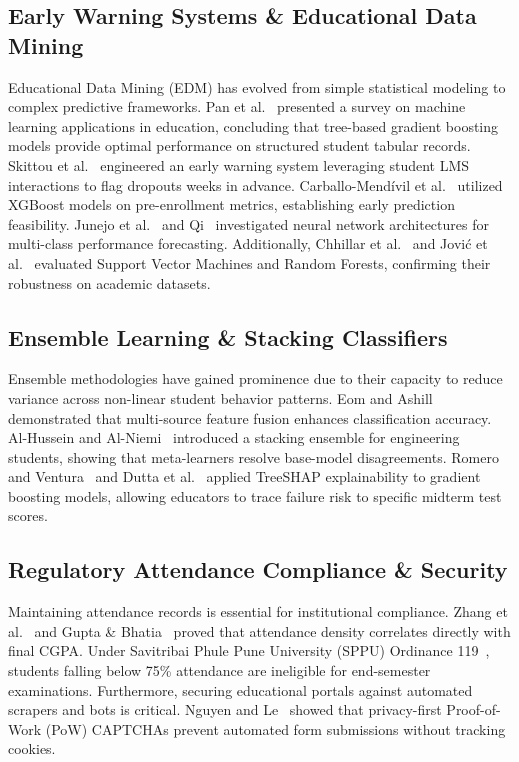 \documentclass[conference]{IEEEtran}
\begin{document}
\subsection{Early Warning Systems \& Educational Data Mining}
Educational Data Mining (EDM) has evolved from simple statistical modeling to complex predictive frameworks. Pan et al.~\cite{pan2025survey} presented a survey on machine learning applications in education, concluding that tree-based gradient boosting models provide optimal performance on structured student tabular records. Skittou et al.~\cite{skittou2024development} engineered an early warning system leveraging student LMS interactions to flag dropouts weeks in advance. Carballo-Mend\'ivil et al.~\cite{carballo2025predicting} utilized XGBoost models on pre-enrollment metrics, establishing early prediction feasibility. Junejo et al.~\cite{junejo2025accurate} and Qi~\cite{qi2026multidimensional} investigated neural network architectures for multi-class performance forecasting. Additionally, Chhillar et al.~\cite{chhillar2025comparative} and Jovi\'c et al.~\cite{jovic2022prediction} evaluated Support Vector Machines and Random Forests, confirming their robustness on academic datasets.

\subsection{Ensemble Learning \& Stacking Classifiers}
Ensemble methodologies have gained prominence due to their capacity to reduce variance across non-linear student behavior patterns. Eom and Ashill~\cite{eom2023evaluating} demonstrated that multi-source feature fusion enhances classification accuracy. Al-Hussein and Al-Niemi~\cite{alhussein2024stacking} introduced a stacking ensemble for engineering students, showing that meta-learners resolve base-model disagreements. Romero and Ventura~\cite{romero2023educational} and Dutta et al.~\cite{dutta2024multivariate} applied TreeSHAP explainability to gradient boosting models, allowing educators to trace failure risk to specific midterm test scores.

\subsection{Regulatory Attendance Compliance \& Security}
Maintaining attendance records is essential for institutional compliance. Zhang et al.~\cite{zhang2024realtime} and Gupta \& Bhatia~\cite{gupta2024attendance} proved that attendance density correlates directly with final CGPA. Under Savitribai Phule Pune University (SPPU) Ordinance 119~\cite{sppu2024ordinance}, students falling below 75\% attendance are ineligible for end-semester examinations. Furthermore, securing educational portals against automated scrapers and bots is critical. Nguyen and Le~\cite{nguyen2024privacy} showed that privacy-first Proof-of-Work (PoW) CAPTCHAs prevent automated form submissions without tracking cookies.
\end{document}
